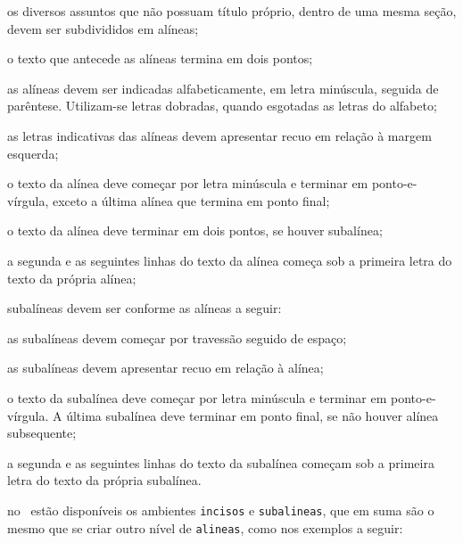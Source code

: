 \begin{alineas}
  \item os diversos assuntos que não possuam título próprio, dentro de uma mesma
  seção, devem ser subdivididos em alíneas; 
  
  \item o texto que antecede as alíneas termina em dois pontos;
  \item as alíneas devem ser indicadas alfabeticamente, em letra minúscula,
  seguida de parêntese. Utilizam-se letras dobradas, quando esgotadas as
  letras do alfabeto;

  \item as letras indicativas das alíneas devem apresentar recuo em relação à
  margem esquerda;

  \item o texto da alínea deve começar por letra minúscula e terminar em
  ponto-e-vírgula, exceto a última alínea que termina em ponto final;

  \item o texto da alínea deve terminar em dois pontos, se houver subalínea;

  \item a segunda e as seguintes linhas do texto da alínea começa sob a
  primeira letra do texto da própria alínea;
  
  \item subalíneas \cite[4.3]{NBR6024:2012} devem ser conforme as alíneas a
  seguir:

  \begin{alineas}
     \item as subalíneas devem começar por travessão seguido de espaço;

     \item as subalíneas devem apresentar recuo em relação à alínea;

     \item o texto da subalínea deve começar por letra minúscula e terminar em
     ponto-e-vírgula. A última subalínea deve terminar em ponto final, se não
     houver alínea subsequente;

     \item a segunda e as seguintes linhas do texto da subalínea começam sob a
     primeira letra do texto da própria subalínea.
  \end{alineas}
  
  \item no \abnTeX\ estão disponíveis os ambientes \texttt{incisos} e
  \texttt{subalineas}, que em suma são o mesmo que se criar outro nível de
  \texttt{alineas}, como nos exemplos a seguir:
  

\end{alineas}
